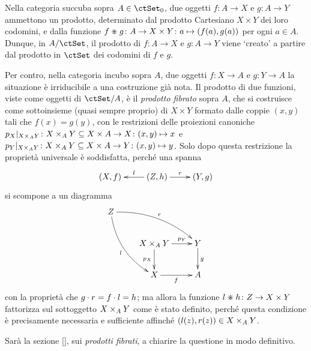 \begin{example}\label{ex_prodotti_in_succuba_incubo}
 Nella categoria succuba sopra \(A\in\ctSet_0\), due oggetti \(f	\colon A\to X\) e \(g \colon A\to Y\) ammettono un prodotto, determinato dal prodotto Cartesiano \(X\times Y\) dei loro codomini, e dalla funzione \(f\pmap g \colon A\to X\times Y\colon a \mapsto (f(a),g(a))\) per ogni \(a\in A\). Dunque, in \(A/\ctSet\), il prodotto di \(f \colon A\to X\) e \(g \colon A\to Y\) viene `creato' a partire dal prodotto in \(\ctSet\) dei codomini di \(f\) e \(g\).

 Per contro, nella categoria incubo sopra \(A\), due oggetti \(f \colon X\to A\) e \(g \colon Y\to A\) la situazione è irriducibile a una costruzione già nota. Il prodotto di due funzioni, viste come oggetti di \(\ctSet/A\), è il \emph{prodotto fibrato} sopra \(A\), che si costruisce come sottoinsieme (quasi sempre proprio) di \(X\times Y\) formato dalle coppie \((x,y)\) tali che \(f(x)=g(y)\), con le restrizioni delle proiezioni canoniche \(p_X|_{\pull XYA} \colon \pull XYA \subseteq X\times A\to X\colon (x,y)\mapsto x\) e \(p_Y|_{\pull XYA} \colon \pull XYA \subseteq X\times A\to Y\colon (x,y)\mapsto y\). Solo dopo questa restrizione la proprietà universale è soddisfatta, perché una spanna
 \[\xymatrix{
   (X,f) & (Z,h) \ar[r]^-r\ar[l]_-l & (Y,g)
  }\]
 si scompone a un diagramma
 \[
  \xymatrix{
  Z \ar@/^1pc/[rrd]^{r} \ar@/_1pc/[rdd]_{l} & & \\
  & \pull XYA \ar[r]^-{p_Y} \ar[d]_{p_X} & Y \ar[d]^{g} \\
  & X \ar[r]_{f} & A
  }
 \] con la proprietà che \(g\cmp r = f\cmp l=h\); ma allora la funzione \(l\pmap h \colon Z\to X\times Y\) fattorizza sul sottoggetto \(\pull XYA\) come è stato definito, perché questa condizione è precisamente necessaria e sufficiente affinché \((l(z),r(z)) \in \pull XYA\).

 Sarà la sezione \ref{}, sui \emph{prodotti fibrati}, a chiarire la questione in modo definitivo.
\end{example}
